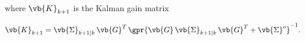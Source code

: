 \begin{enumerate}[a)]
	where $\vb{K}_{k+1}$ is the Kalman gain matrix
	
	\begin{equation}
		\vb{K}_{k+1} = \vb{\Sigma}_{k+1 \vert k}\,\vb{G}^T\,\gpr{\vb{G}\,\vb{\Sigma}_{k+1 \vert k}\,\vb{G}^T + \vb{\Sigma}^{o}}^{-1}.
	\end{equation}
	
\end{enumerate}
